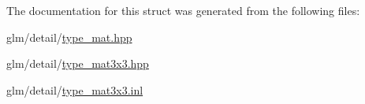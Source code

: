 The documentation for this struct was generated from the following files\-:\begin{DoxyCompactItemize}
\item 
glm/detail/\hyperlink{type__mat_8hpp}{type\-\_\-mat.\-hpp}\item 
glm/detail/\hyperlink{type__mat3x3_8hpp}{type\-\_\-mat3x3.\-hpp}\item 
glm/detail/\hyperlink{type__mat3x3_8inl}{type\-\_\-mat3x3.\-inl}\end{DoxyCompactItemize}
